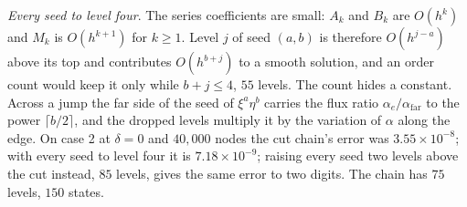 \documentclass[11pt]{amsart}
\theoremstyle{definition}
\theoremstyle{remark}
\newcommand{\para}[1]{\par\smallskip\noindent\textit{#1}.\enspace}
\newcommand{\sci}[2]{#1 \times 10^{#2}}
\begin{document}
\para{Every seed to level four}
The series coefficients are small: $A_k$ and $B_k$ are $O(h^k)$ and $M_k$
is $O(h^{k+1})$ for $k \ge 1$. Level $j$ of seed $(a, b)$ is therefore
$O(h^{j - a})$ above its top and contributes $O(h^{b + j})$ to a smooth
solution, and an order count would keep it only while $b + j \le 4$, $55$
levels. The count hides a constant. Across a jump the far side of the seed
of $\xi^a \eta^b$ carries the flux ratio $\alpha_e / \alpha_{\mathrm{far}}$
to the power $\lceil b/2 \rceil$, and the dropped levels multiply it by the
variation of $\alpha$ along the edge. On case 2 at $\delta = 0$ and $40{,}000$
nodes the cut chain's error was $\sci{3.55}{-8}$; with every seed to level
four it is $\sci{7.18}{-9}$; raising every seed two levels above the cut
instead, $85$ levels, gives the same error to two digits. The chain has $75$ levels, $150$ states.
\end{document}
